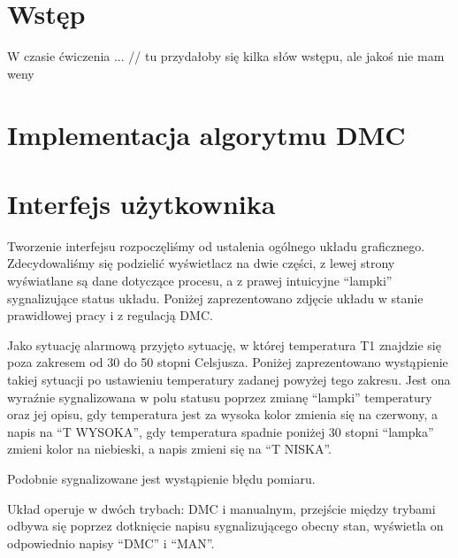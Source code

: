 \chapter{Wstęp}
W czasie ćwiczenia ... // tu przydałoby się kilka słów wstępu, ale jakoś nie mam weny

\chapter{Implementacja algorytmu DMC}

\chapter{Interfejs użytkownika}
Tworzenie interfejsu rozpoczęliśmy od ustalenia ogólnego układu graficznego. Zdecydowaliśmy się podzielić wyświetlacz na dwie części, z lewej strony wyświatlane są dane dotyczące procesu, a z prawej intuicyjne ``lampki'' sygnalizujące status układu. Poniżej zaprezentowano zdjęcie układu w stanie prawidłowej pracy i z regulacją DMC.


\begin{figure}[ht]
\centering
{}
\label{R4}
\end{figure}


Jako sytuację alarmową przyjęto sytuację, w której temperatura T1 znajdzie się poza zakresem od 30 do 50 stopni Celsjusza. Poniżej zaprezentowano wystąpienie takiej sytuacji po ustawieniu temperatury zadanej powyżej tego zakresu. Jest ona wyraźnie sygnalizowana w polu statusu poprzez zmianę ``lampki'' temperatury oraz jej opisu, gdy temperatura jest za wysoka kolor zmienia się na czerwony, a napis na ``T WYSOKA'', gdy temperatura spadnie poniżej 30 stopni ``lampka'' zmieni kolor na niebieski, a napis zmieni się na ``T NISKA''.

\begin{figure}[ht]
\centering
{}
\label{R1}
\end{figure}


Podobnie sygnalizowane jest wystąpienie błędu pomiaru.


\begin{figure}[ht]
\centering
{}
\label{R3}
\end{figure}


Układ operuje w dwóch trybach: DMC i manualnym, przejście między trybami odbywa się poprzez dotknięcie napisu sygnalizującego obecny stan, wyświetla on odpowiednio napisy ``DMC'' i ``MAN''.


